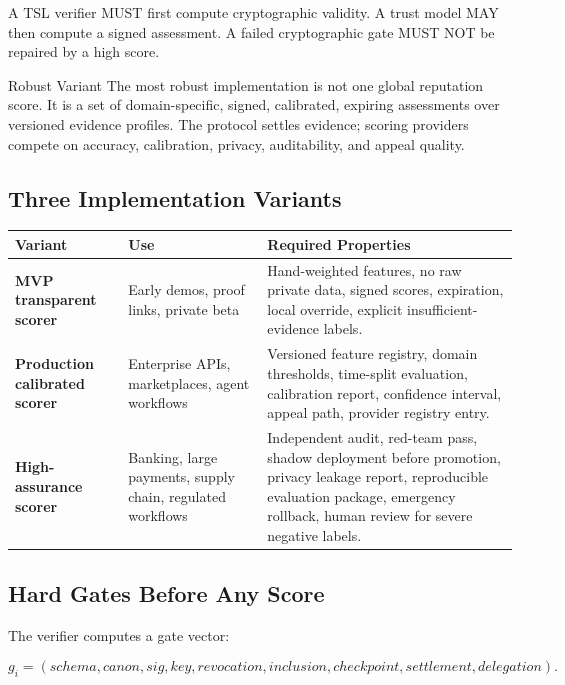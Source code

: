 \documentclass[11pt]{article}
\newcommand{\TSL}{\textsc{TSL}}
\begin{document}
A \TSL{} verifier MUST first compute cryptographic validity. A trust model MAY then compute a signed assessment. A failed cryptographic gate MUST NOT be repaired by a high score.

\begin{principlebox}{Robust Variant}
The most robust implementation is not one global reputation score. It is a set of domain-specific, signed, calibrated, expiring assessments over versioned evidence profiles. The protocol settles evidence; scoring providers compete on accuracy, calibration, privacy, auditability, and appeal quality.
\end{principlebox}

\subsection{Three Implementation Variants}

\begin{center}
\begin{tabularx}{\textwidth}{>{\bfseries}p{} p{} X}
\toprule
Variant & Use & Required Properties \\
\midrule
MVP transparent scorer & Early demos, proof links, private beta & Hand-weighted features, no raw private data, signed scores, expiration, local override, explicit insufficient-evidence labels. \\
Production calibrated scorer & Enterprise APIs, marketplaces, agent workflows & Versioned feature registry, domain thresholds, time-split evaluation, calibration report, confidence interval, appeal path, provider registry entry. \\
High-assurance scorer & Banking, large payments, supply chain, regulated workflows & Independent audit, red-team pass, shadow deployment before promotion, privacy leakage report, reproducible evaluation package, emergency rollback, human review for severe negative labels. \\
\bottomrule
\end{tabularx}
\end{center}

\subsection{Hard Gates Before Any Score}

The verifier computes a gate vector:

\begin{equation}
g_i=(schema,canon,sig,key,revocation,inclusion,checkpoint,settlement,delegation).
\end{equation}
\end{document}
